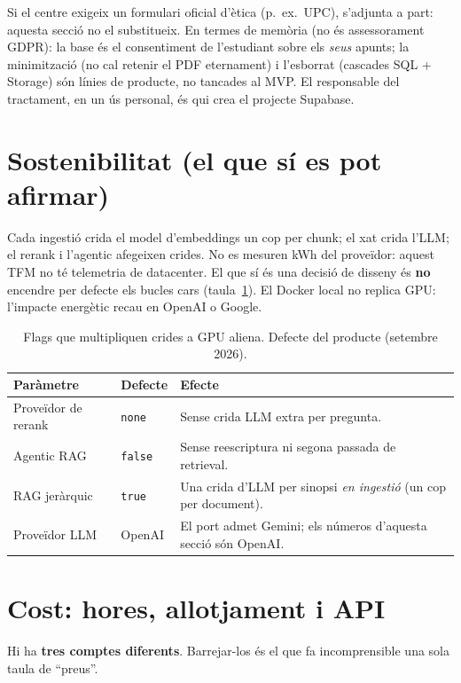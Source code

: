 Si el centre exigeix un formulari oficial d'ètica (p.~ex.\ UPC), s'adjunta a part: aquesta secció no el substitueix. En termes de memòria (no és assessorament GDPR): la base és el consentiment de l'estudiant sobre els \emph{seus} apunts; la minimització (no cal retenir el PDF eternament) i l'esborrat (cascades SQL + Storage) són línies de producte, no tancades al MVP. El responsable del tractament, en un ús personal, és qui crea el projecte Supabase.

\section{Sostenibilitat (el que sí es pot afirmar)}

Cada ingestió crida el model d'embeddings un cop per chunk; el xat crida l'LLM; el rerank i l'agentic afegeixen crides. No es mesuren kWh del proveïdor: aquest TFM no té telemetria de datacenter. El que sí és una decisió de disseny és \textbf{no} encendre per defecte els bucles cars (taula~\ref{tab:flags-cost}). El Docker local no replica GPU: l'impacte energètic recau en OpenAI o Google.

\begin{table}[htbp]
\centering
\caption{Flags que multipliquen crides a GPU aliena. Defecte del producte (setembre 2026).}
\label{tab:flags-cost}
\small
\begin{tabularx}{\textwidth}{>{\raggedright\arraybackslash}p{3.6cm} l X}
\toprule
Paràmetre & Defecte & Efecte \\
\midrule
Proveïdor de rerank & \texttt{none} & Sense crida LLM extra per pregunta. \\
Agentic RAG & \texttt{false} & Sense reescriptura ni segona passada de retrieval. \\
RAG jeràrquic & \texttt{true} & Una crida d'LLM per sinopsi \emph{en ingestió} (un cop per document). \\
Proveïdor LLM & OpenAI & El port admet Gemini; els números d'aquesta secció són OpenAI. \\
\bottomrule
\end{tabularx}
\end{table}

\section{Cost: hores, allotjament i API}
\label{sec:cost-api}

Hi ha \textbf{tres comptes diferents}. Barrejar-los és el que fa incomprensible una sola taula de ``preus''.

